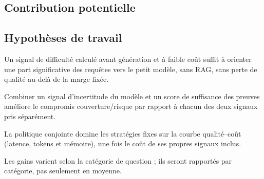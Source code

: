 \documentclass[11pt,a4paper]{article}
\begin{document}
\subsection{Contribution potentielle}
\begin{center}
\end{center}

\subsection{Hypothèses de travail}
\begin{description}[style=nextline,leftmargin=0.5cm]
\item[H1 (QR1)] Un signal de difficulté calculé avant génération et à faible coût suffit à orienter une
part significative des requêtes vers le petit modèle, sans RAG, sans perte de qualité au-delà de la
marge fixée.
\item[H2 (QR2)] Combiner un signal d'incertitude du modèle et un score de suffisance des preuves
améliore le compromis couverture/risque par rapport à chacun des deux signaux pris séparément.
\item[H3 (QR3)] La politique conjointe domine les stratégies fixes sur la courbe qualité--coût
(latence, tokens et mémoire), une fois le coût de ses propres signaux inclus.
\item[H4 (QR4)] Les gains varient selon la catégorie de question ; ils seront rapportés par catégorie,
pas seulement en moyenne.
\end{description}
\end{document}
